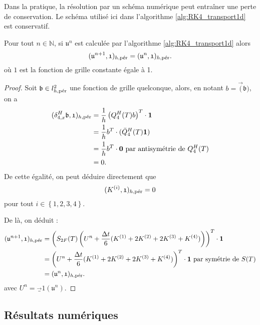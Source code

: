 Dans la pratique, la résolution par un schéma numérique peut entraîner une perte de conservation. 
Le schéma utilisé ici dans l'algorithme \ref{alg:RK4_transport1d} est conservatif.

\begin{proposition}
Pour tout $n \in \mathbb{N}$, si $\mathfrak{u}^n$ est calculée par l'algorithme \ref{alg:RK4_transport1d} alors
\begin{equation}
(\mathfrak{u}^{n+1}, \mathfrak{1})_{h,\per} = (\mathfrak{u}^n, \mathfrak{1})_{h,\per}.
\end{equation}
où $\mathfrak{1}$ est la fonction de grille constante égale à 1.
\end{proposition}

\begin{proof}
Soit $\mathfrak{b} \in l^2_{h,\per}$ une fonction de grille quelconque, alors, en notant $b=\vec(\mathfrak{b})$, on a
\begin{align*}
(\delta_{4,x}^H \mathfrak{b}, \mathfrak{1})_{h,\per} & = \dfrac{1}{h} \left( Q_4^H(T) b \right)^T \cdot \mathbf{1} \\
	& = \dfrac{1}{h} b^T \cdot (\bar{Q}_4^H(T) \mathbf{1}) \\
	& = \dfrac{1}{h} b^T \cdot \mathbf{0} \text{ par antisymétrie de }Q_4^H(T)\\
	& = 0.
\end{align*}
De cette égalité, on peut déduire directement que
\begin{equation}
(K^{(i)}, \mathfrak{1})_{h,\per} = 0
\end{equation}
pour tout $i \in \left\lbrace 1, 2, 3, 4 \right\rbrace$.

De là, on déduit :
\begin{align*}
(\mathfrak{u}^{n+1},\mathfrak{1})_{h,\per} & =  \left( S_{2F}(T) \left( U^n + \dfrac{\Delta t}{6}(K^{(1)}+2K^{(2)}+2K^{(3)}+K^{(4)})  \right) \right)^T \cdot \mathbf{1} \\
	& = \left( U^n + \dfrac{\Delta t}{6}(K^{(1)}+2K^{(2)}+2K^{(3)}+K^{(4)})  \right)^T \cdot \mathbf{1} \text{ par symétrie de } S(T)\\
	& = (\mathfrak{u}^n , \mathfrak{1})_{h,\per}.
\end{align*}
avec $U^n = \vec_1(\mathfrak{u}^n)$.
\end{proof}

\subsection{Résultats numériques}

